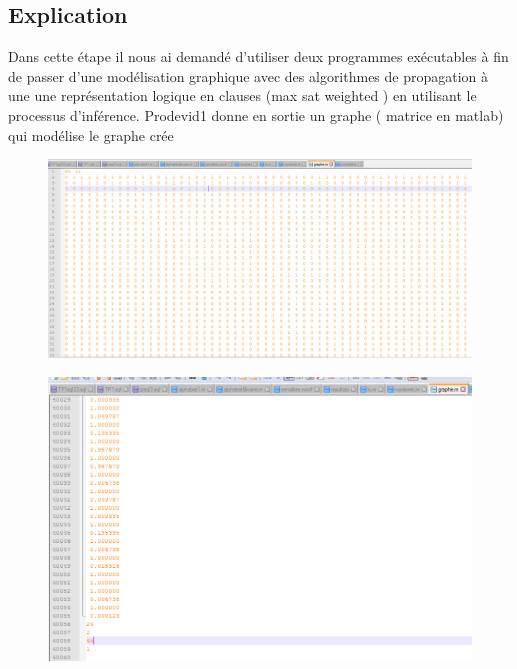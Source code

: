 \documentclass[12pt,a4paper,oneside]{book}
\begin{document}
	\subsection{Explication  }
      Dans cette étape il nous ai demandé d'utiliser deux programmes exécutables
      à fin de passer d'une modélisation graphique avec des algorithmes de propagation à une une représentation logique en clauses (max sat weighted ) en utilisant le processus d'inférence.
            Prodevid1 donne en sortie un graphe ( matrice en matlab) qui modélise le graphe crée
            \begin{figure}[H]
            	\centering
            	\includegraphics[scale=0.7]{screens/etape2graph.png}
            	\label{labelname}%
            	
            \end{figure}
            \begin{figure}[H]
            	\centering
            	\includegraphics[scale=0.7]{screens/etape2graph2.png}
            	\label{labelname}%
            \end{figure}
      
\end{document}
